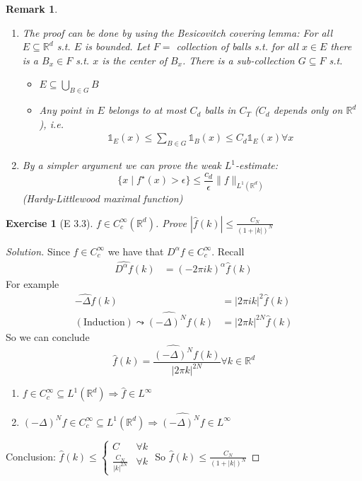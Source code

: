 \documentclass{report}
\theoremstyle{tommy}
\newtheorem{rem}[defn]{Remark}
\newtheorem{ex}[defn]{Exercise}
\begin{document}
  \begin{rem}
    \begin{enumerate}
      \item The proof can be done by using the Besicovitch covering lemma: For all \(E \subseteq \mathbb{R}^d\) s.t. \(E\) is bounded. Let \(F = \) collection of balls s.t. for all \(x \in E\) there is a \(B_x \in F\) s.t. \(x\) is the center of \(B_x\). There is a sub-collection \(G \subseteq F\) s.t.
      \begin{itemize}
        \item \(E \subseteq \bigcup_{B \in G} B\)
        \item Any point in \(E\) belongs to at most \(C_d\) balls in \(C_T\) (\(C_d\) depends only on \(\mathbb{R}^d\)), i.e. 
        \begin{align*}
          \mathbb{1}_E(x) \le \sum_{B \in G} \mathbb{1}_B(x) \le C_d \mathbb{1}_E(x) \forall x
        \end{align*}
      \end{itemize}
      \item By a simpler argument we can prove the weak \(L^1\)-estimate:
      \[\{x \mid f^\star(x) > \epsilon\} \le \frac{c_d}{\epsilon} \|f\|_{L^1(\mathbb{R}^d)}\] (Hardy-Littlewood maximal function)
    \end{enumerate}
  \end{rem}
  
  \begin{ex}[E 3.3]
    \(f \in C_c^\infty(\mathbb{R}^d)\). Prove \(|\hat f(k)| \le \frac{C_N}{(1 + |k|)^N}\)
  \end{ex}

  \begin{proof}[Solution]
    Since \(f \in C_c^\infty\) we have that \(D^\alpha f \in C_c^\infty\).
    Recall
    \begin{align*}
      \widehat{D^\alpha f}(k) &= (-2 \pi ik)^\alpha \hat f (k)
    \end{align*}
    For example
    \begin{align*}
      \widehat{- \Delta f}(k) &= |2 \pi i k|^2 \hat f (k) \\
      (\text{Induction}) \leadsto \widehat{(-\Delta)^N f}(k) &= |2 \pi k|^{2N} \hat f (k)
    \end{align*}
    So we can conclude
    \[ \hat f(k) = \frac{\widehat{(-\Delta)^N}f(k)}{|2 \pi k|^{2N}} \forall k \in \mathbb{R}^d\]
    \begin{enumerate}
      \item \(f \in C_c^\infty \subseteq L^1(\mathbb{R}^d) \Rightarrow \hat f \in L^\infty\)
      \item \((-\Delta)^N f \in C_c^\infty \subseteq L^1(\mathbb{R}^d) \Rightarrow \widehat{(-\Delta)^N f} \in L^\infty\)
    \end{enumerate}
    Conclusion: \(\hat f(k) \le \begin{cases}
      C &\forall k \\ \frac{C_N}{|k|^{2N}} &\forall k
    \end{cases}\)
    So \(\hat f(k) \le \frac{C_N}{(1+|k|)^N}\)
  \end{proof}
\end{document}
